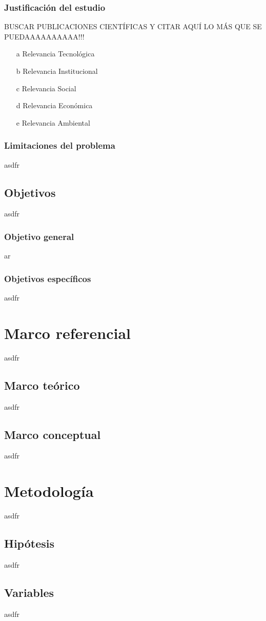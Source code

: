 \documentclass{report}
\begin{document}
\subsection{Justificación del estudio}
BUSCAR PUBLICACIONES CIENTÍFICAS Y CITAR AQUÍ LO MÁS QUE SE PUEDAAAAAAAAAA!!!
\begin{enumerate}
\item[a] Relevancia Tecnológica
\item[b] Relevancia Institucional
\item[c] Relevancia Social
\item[d] Relevancia Económica
\item[e] Relevancia Ambiental
\end{enumerate}
\subsection{Limitaciones del problema}
asdfr
\section{Objetivos}
asdfr
\subsection{Objetivo general}
ar
\subsection{Objetivos específicos}
asdfr
\chapter{Marco referencial}
asdfr
\section{Marco teórico}
asdfr
\section{Marco conceptual}
asdfr
\chapter{Metodología}
asdfr
\section{Hipótesis}
asdfr
\section{Variables}
asdfr
\end{document}
